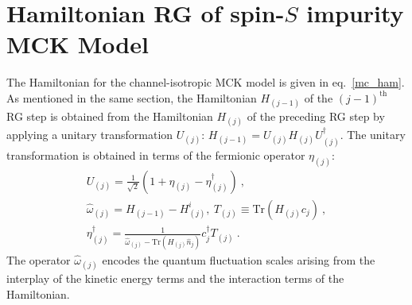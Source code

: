 \documentclass[reprint,prb,superscriptaddress]{revtex4-2}
\begin{document}
%
%
%
%
%
%
%
%
%
%
%



\section{Hamiltonian RG of spin-\(S\) impurity MCK Model}
\label{appendix_urg}
The Hamiltonian for the channel-isotropic MCK model is given in eq.~\ref{mc_ham}. As mentioned in the same section, the Hamiltonian \(H_{(j-1)}\) of the \((j-1)^\text{th}\) RG step is obtained from the Hamiltonian \(H_{(j)}\) of the preceding RG step by applying a unitary transformation \(U_{(j)}\): \(H_{(j-1)} = U_{(j)} H_{(j)} U^\dagger_{(j)}\). The unitary transformation is obtained in terms of the fermionic operator \(\eta_{(j)}\):
\begin{gather}
	U_{(j)} = \frac{1}{\sqrt 2}\left(1 + \eta_{(j)} - \eta_{(j)}^\dagger\right)~, \\
	\hat \omega_{(j)} = H_{(j-1)} - H^i_{(j)},~T_{(j)} \equiv \text{Tr}\left(H_{(j)}c_{j}\right)~,\\
	\eta^\dagger_{(j)} = \frac{1}{\hat \omega_{(j)} - \text{Tr}\left(H_{(j)} \hat n_{j}\right) } c^\dagger_{j} T_{(j)}~.
\end{gather}
The operator \(\hat \omega_{(j)}\) encodes the quantum fluctuation scales arising from the interplay of the kinetic energy terms and the interaction terms of the Hamiltonian.
\end{document}
